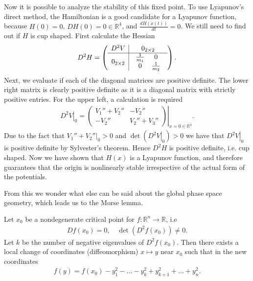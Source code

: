 \begin{ex}
Now it is possible to analyze the stability of this fixed point. To use Lyapunov's direct method, the Hamiltonian is a good candidate for a Lyapunov function, because $H(0)=0$, $DH(0) = 0 \in \mathbb{R}^{4}$, and $\frac{dH(x(t))}{dt}=0$. We still need to find out if $H$ is cup shaped. First calculate the Hessian
\begin{align}
	D^2H = 
	\left(
	\begin{array}{c|c}
		D^2V & 0_{2\times 2} \\
		\hline
		0_{2\times 2} &
		\begin{array}{c c}
			\frac{1}{m_1} & 0 \\
			0 & \frac{1}{m_2}
		\end{array}
	\end{array}
\right)
.
\end{align}
Next, we evaluate if each of the diagonal matrices are positive definite. The lower right matrix is clearly positive definite as it is a diagonal matrix with strictly positive entries. For the upper left, a calculation is required
\begin{align}
\left.D^2V\right|_{0} = 
	\left.\begin{pmatrix}
		V_{1}'' + V_{2}'' & -V_{2}'' \\
		-V_{2}'' & V_{2}'' + V_{3}''
	\end{pmatrix} \right|_{x = 0 \in \mathbb{R}^{4}}.
\end{align}
Due to the fact that $\left. V_{1}'' + V_{2}''\right|_{0}>0$ and $\det\left(\left.D^2V\right|_{0}\right) >0$ we have that $\left.D^2V\right|_{0}$ is positive definite by Sylvester's theorem. Hence $D^2H$ is positive definite, i.e. cup shaped. Now we have shown that $H(x)$ is a Lyapunov function, and therefore guarantees that the origin is nonlinearly stable irrespective of the actual form of the potentials. 

From this we wonder what else can be said about the global phase space geometry, which leads us to the Morse lemma.
\begin{lemma}[Morse]
Let $x_0$ be a nondegenerate critical point for $f:\mathbb{R}^{n}\to \mathbb{R}$, i.e 
\begin{align}
	Df(x_0) =0,\quad \det\left(D^{2}f(x_0)\right)\neq 0.
\end{align}
Let $k$ be the number of negative eigenvalues of $D^2f(x_0)$. Then there exists a local change of coordinates (diffeomorphism) $x\mapsto y$ near $x_0 $ such that in the new coordinates
\begin{align}
	f(y) = f(x_0) - y_1^{2} - \ldots - y_{k}^{2} + y_{k+1}^{2} + \ldots +y_{n}^{2}.
\end{align}
\end{lemma}


\end{ex}
